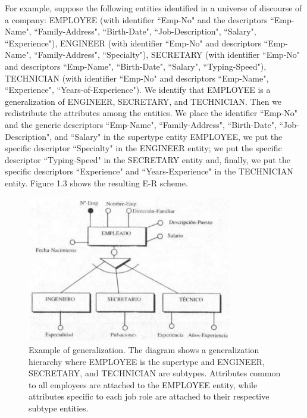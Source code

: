 \documentclass{article}
\numberwithin{figure}{section}
\begin{document}
For example, suppose the following entities identified in a universe of discourse of a company: EMPLOYEE (with identifier ``Emp-No" and the descriptors ``Emp-Name", ``Family-Address", ``Birth-Date", ``Job-Description", ``Salary", ``Experience"), ENGINEER (with identifier ``Emp-No" and descriptors ``Emp-Name", ``Family-Address", ``Specialty"), SECRETARY (with identifier ``Emp-No" and descriptors ``Emp-Name", ``Birth-Date", ``Salary", ``Typing-Speed"), TECHNICIAN (with identifier ``Emp-No" and descriptors ``Emp-Name", ``Experience", ``Years-of-Experience").  We identify that EMPLOYEE is a generalization of ENGINEER, SECRETARY, and TECHNICIAN.  Then we redistribute the attributes among the entities.  We place the identifier ``Emp-No" and the generic descriptors ``Emp-Name", ``Family-Address", ``Birth-Date", ``Job-Description", and ``Salary" in the supertype entity EMPLOYEE, we put the specific descriptor ``Specialty" in the ENGINEER entity; we put the specific descriptor ``Typing-Speed" in the SECRETARY entity and, finally, we put the specific descriptors ``Experience" and ``Years-Experience" in the TECHNICIAN entity.  Figure 1.3 shows the resulting E-R scheme.

\begin{figure}
    \centering
    \includegraphics[width=0.8\textwidth]{figures/fig3}
    \caption{Example of generalization. The diagram shows a generalization hierarchy where EMPLOYEE is the supertype and ENGINEER, SECRETARY, and TECHNICIAN are subtypes. Attributes common to all employees are attached to the EMPLOYEE entity, while attributes specific to each job role are attached to their respective subtype entities.}
    \label{fig:fig1.3}
\end{figure}
\end{document}
